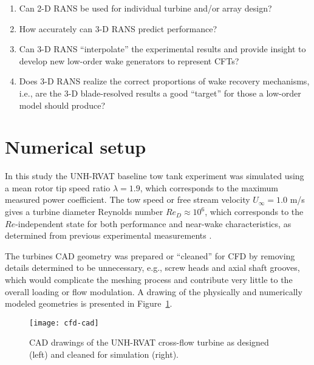 \begin{enumerate}
    \item Can 2-D RANS be used for individual turbine and/or array design?

    \item How accurately can 3-D RANS predict performance?

    \item Can 3-D RANS ``interpolate'' the experimental results and provide
    insight to develop new low-order wake generators to represent CFTs?

    \item Does 3-D RANS realize the correct proportions of wake recovery
    mechanisms, i.e., are the 3-D blade-resolved results a good ``target'' for
    those a low-order model should produce?
\end{enumerate}


\section{Numerical setup}

In this study the UNH-RVAT baseline tow tank experiment was simulated using a
mean rotor tip speed ratio $\lambda=1.9$, which corresponds to the maximum
measured power coefficient. The tow speed or free stream velocity $U_\infty=1.0$
m/s gives a turbine diameter Reynolds number $Re_D \approx 10^6$, which
corresponds to the $Re$-independent state for both performance and near-wake
characteristics, as determined from previous experimental measurements
\cite{Bachant2014, Bachant2016-Energies}.

The turbines CAD geometry was prepared or ``cleaned'' for CFD by removing
details determined to be unnecessary, e.g., screw heads and axial shaft grooves,
which would complicate the meshing process and contribute very little to the
overall loading or flow modulation. A drawing of the physically and numerically
modeled geometries is presented in Figure~\ref{fig:cfd-cad}.

\begin{figure}
    \centering
    
    \texttt{[image: cfd-cad]}
    
    \caption{CAD drawings of the UNH-RVAT cross-flow turbine as designed (left)
        and cleaned for simulation (right).}
    
    \label{fig:cfd-cad}
\end{figure}

